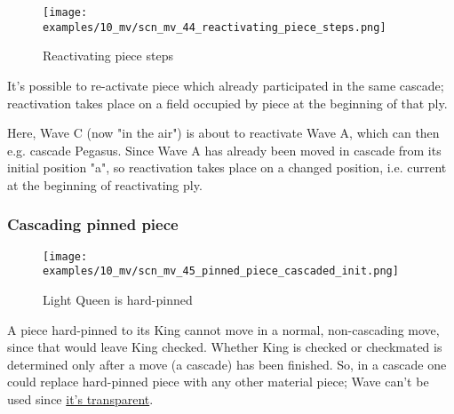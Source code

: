 \clearpage %

\vspace*{-2.1\baselineskip}
\noindent
\begin{figure}[!h]
\texttt{[image: examples/10\_mv/scn\_mv\_44\_reactivating\_piece\_steps.png]}
\vspace*{-1.3\baselineskip}
\caption{Reactivating piece steps}
\label{fig:scn_mv_44_reactivating_piece_steps}
\end{figure}

\vspace*{-0.3\baselineskip}
It's possible to re-activate piece which already participated in the same cascade;
reactivation takes place on a field occupied by piece at the beginning of that ply.

Here, Wave C (now "in the air") is about to reactivate Wave A, which can then e.g.
cascade Pegasus. Since Wave A has already been moved in cascade from its initial
position "a", so reactivation takes place on a changed position, i.e. current at
the beginning of reactivating ply.

\clearpage %

\subsubsection*{Cascading pinned piece}
\label{sec:Miranda's veil/Wave/Cascading Waves/Cascading pinned piece}

\vspace*{-1.5\baselineskip}
\noindent
\begin{figure}[!h]
\texttt{[image: examples/10\_mv/scn\_mv\_45\_pinned\_piece\_cascaded\_init.png]}
\vspace*{-1.3\baselineskip}
\caption{Light Queen is hard-pinned}
\label{fig:scn_mv_45_pinned_piece_cascaded_init}
\end{figure}

\vspace*{-0.5\baselineskip}
A piece hard-pinned to its King cannot move in a normal, non-cascading move, since
that would leave King checked. Whether King is checked or checkmated is determined
only after a move (a cascade) has been finished. So, in a cascade one could replace
hard-pinned piece with any other material piece; Wave can't be used since
\hyperref[fig:scn_mv_07_wave_is_transparent]{it's transparent}.

